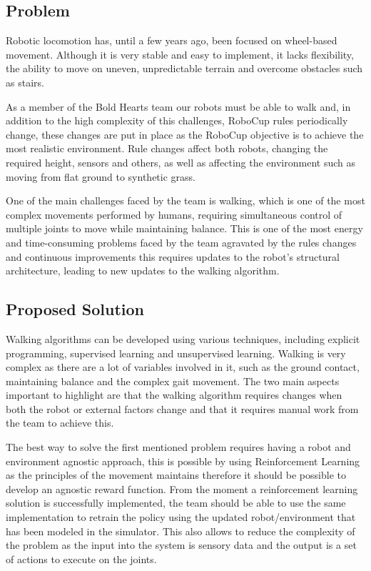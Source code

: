         \subsection{Problem}
        Robotic locomotion has, until a few years ago, been focused on wheel-based movement. Although it is very stable and easy to implement, it lacks flexibility, the ability to move on uneven, unpredictable terrain and overcome obstacles such as stairs.

        As a member of the Bold Hearts team our robots must be able to walk and, in addition to the high complexity of this challenges, 
        RoboCup rules periodically change, these changes are put in place as the RoboCup objective is to achieve the most realistic environment. 
        Rule changes affect both robots, changing the required height, sensors and others, as well as affecting the environment such as moving from flat ground to synthetic grass.

        One of the main challenges faced by the team is walking, which is one of the most complex movements performed by humans, requiring simultaneous control of multiple joints to move while maintaining balance. 
        This is one of the most energy and time-consuming problems faced by the team agravated by the rules changes and continuous improvements this requires updates to the robot's structural architecture, leading to new updates to the walking algorithm.

        \subsection{Proposed Solution}

        Walking algorithms can be developed using various techniques, 
        including explicit programming, supervised learning and unsupervised learning. 
        Walking is very complex as there are a lot of variables involved in it, such as the ground contact, 
        maintaining balance and the complex gait movement. The two main aspects important to highlight are that the walking algorithm requires changes when both the robot or external factors change and that it requires manual work from the team to achieve this. %

        The best way to solve the first mentioned problem requires having a robot and environment agnostic approach, this is possible by using Reinforcement Learning as the principles of the movement maintains therefore it should be possible to develop an agnostic reward function.
        From the moment a reinforcement learning solution is successfully implemented, the team should be able to use the same implementation to retrain the policy using the updated robot/environment that has been modeled in the simulator.
        This also allows to reduce the complexity of the problem as the input into the system is sensory data and the output is a set of actions to execute on the joints.

